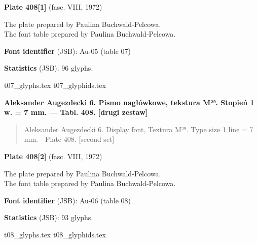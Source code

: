 \documentclass[12pt]{article}
\newcommand{\bg}{\begingl}
\newcommand{\pismoPL}[1]{{\relsize{2}\Junicode\textbf{#1}}}
\newcommand{\pismoEN}[1]{{\relsize{1}\Junicode\begin{quote}#1\end{quote}}}
\newcommand{\plate}[3]{\textbf{Plate #1} (fasc. #2, #3)}
\newcommand{\fontID}[2]{{\relsize{1}\Junicode\textbf{Font identifier} (JSB): #1 (table #2)}}
\newcommand{\fontstat}[1]{{\relsize{1}\Junicode\textbf{Statistics} (JSB): #1 glyphs.}}
\begin{document}
\plate{408[1]}{VIII}{1972}

The plate    prepared by Paulina Buchwald-Pelcowa.\\
The font table    prepared by Paulina Buchwald-Pelcowa.\\

\bigskip

\fontID{Au-05}{07}

    \fontstat{96}
    
  {t07_glyphs.tex}
  {t07_glyphids.tex}

\newpage


\pismoPL{Aleksander Augezdecki 6. Pismo nagłówkowe, tekstura M²⁹. Stopień 1 w. = 7 mm. — Tabl. 408. [drugi zestaw]}

\pismoEN{Aleksander Augezdecki 6. Display font, Textura M²⁹. Type size 1 line = 7 mm. - Plate 408. [second set]}
\medskip

\plate{408[2]}{VIII}{1972}

The plate    prepared by Paulina Buchwald-Pelcowa.\\
The font table    prepared by Paulina Buchwald-Pelcowa.\\


\bigskip

\fontID{Au-06}{08}

    \fontstat{93}

  {t08_glyphs.tex}
  {t08_glyphids.tex}


 
 \newpage


\end{document}
